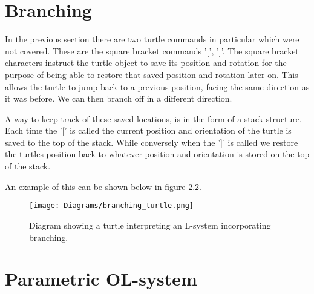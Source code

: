 \section{Branching} \label{branching}

\begin{flushleft}

In the previous section there are two turtle commands in particular which were  not covered. These are the square bracket commands '[', ']'. The square bracket characters instruct the turtle object to save its position and rotation for the purpose of being able to restore that saved position and rotation later on. This allows the turtle to jump back to a previous position, facing the same direction as it was before. We can then branch off in a different direction.\\

\vspace{5mm}

A way to keep track of these saved locations, is in the form of a stack structure. Each time the '[' is called the current position and orientation of the turtle is saved to the top of the stack. While conversely when the ']' is called we restore the turtles position back to whatever position and orientation is stored on the top of the stack. \\

\vspace{5mm}

An example of this can be shown below in figure 2.2.\\

\begin{figure}[htbp]
	{\centering
		\vspace{7px}
		\texttt{[image: Diagrams/branching\_turtle.png]}
		\caption{Diagram showing a turtle interpreting an L-system incorporating branching.}
	}
\end{figure}
\FloatBarrier

\end{flushleft}

\section{Parametric OL-system} \label{parametric}

